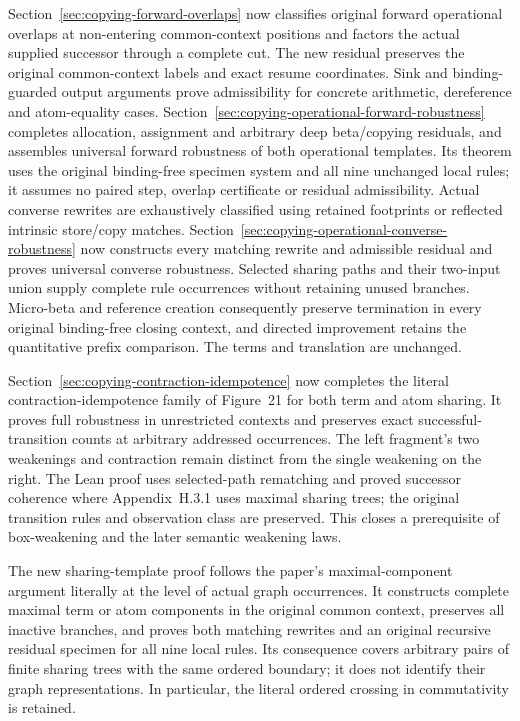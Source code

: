 Section~\ref{sec:copying-forward-overlaps} now classifies original forward
operational overlaps at non-entering common-context positions and factors the actual supplied successor through a
complete cut. The new residual preserves the original common-context labels
and exact resume coordinates. Sink and binding-guarded output arguments prove
admissibility for concrete arithmetic, dereference and atom-equality cases.
Section~\ref{sec:copying-operational-forward-robustness} completes allocation,
assignment and arbitrary deep beta/copying residuals, and assembles universal
forward robustness of both operational templates. Its theorem uses the original
binding-free specimen system and all nine unchanged local rules; it assumes no
paired step, overlap certificate or residual admissibility. Actual converse
rewrites are exhaustively classified using retained footprints or reflected
intrinsic store/copy matches.
Section~\ref{sec:copying-operational-converse-robustness} now constructs every
matching rewrite and admissible residual and proves universal converse
robustness. Selected sharing paths and their two-input union supply complete
rule occurrences without retaining unused branches. Micro-beta and reference
creation consequently preserve termination in every original binding-free
closing context, and directed improvement retains the quantitative prefix
comparison. The terms and translation are unchanged.

Section~\ref{sec:copying-contraction-idempotence} now completes the literal
contraction-idempotence family of Figure~21 for both term and atom sharing.
It proves full robustness in unrestricted contexts and preserves exact
successful-transition counts at arbitrary addressed occurrences. The left
fragment's two weakenings and contraction remain distinct from the single
weakening on the right. The Lean proof uses selected-path rematching and
proved successor coherence where Appendix~H.3.1 uses maximal sharing trees;
the original transition rules and observation class are preserved. This
closes a prerequisite of box-weakening and the later semantic weakening laws.

The new sharing-template proof follows the paper's maximal-component argument
literally at the level of actual graph occurrences. It constructs complete
maximal term or atom components in the original common context, preserves
all inactive branches, and proves both matching rewrites and an original
recursive residual specimen for all nine local rules. Its consequence covers
arbitrary pairs of finite sharing trees with the same ordered boundary; it
does not identify their graph representations. In particular, the literal
ordered crossing in commutativity is retained.

